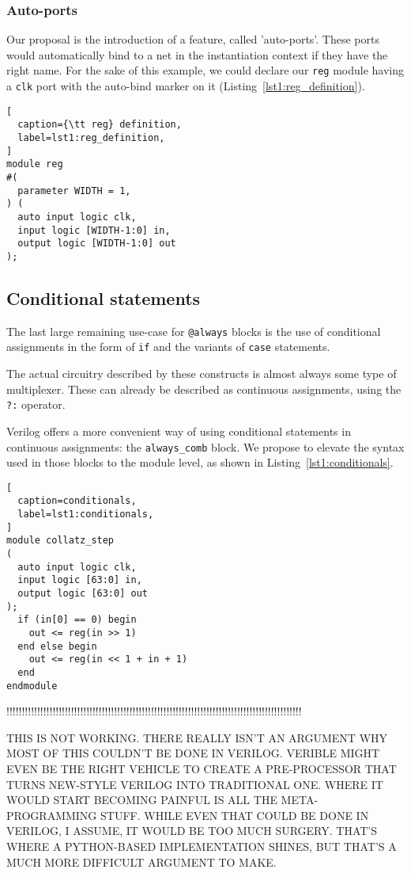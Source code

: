 \documentclass[conference,compsoc]{IEEEtran}
\begin{document}
\subsubsection{Auto-ports}
Our proposal is the introduction of a feature, called 'auto-ports'. These ports would automatically
bind to a net in the instantiation context if they have the right name. For the sake of this
example, we could declare our {\tt reg} module having a {\tt clk} port with the auto-bind
marker on it (Listing~\ref{lst1:reg_definition}).

\begin{lstlisting}[
  caption={\tt reg} definition,
  label=lst1:reg_definition,
]
module reg
#(
  parameter WIDTH = 1,
) (
  auto input logic clk,
  input logic [WIDTH-1:0] in,
  output logic [WIDTH-1:0] out
);
\end{lstlisting}

\subsection{Conditional statements}
The last large remaining use-case for {\tt @always} blocks is the use of conditional
assignments in the form of {\tt if} and the variants of {\tt case} statements.

The actual circuitry described by these constructs is almost always some type of
multiplexer. These can already be described as continuous assignments, using the
{\tt ?:} operator.

Verilog offers a more convenient way of using conditional statements in continuous
assignments: the {\tt always\_comb} block. We propose to elevate the syntax used
in those blocks to the module level, as shown in Listing~\ref{lst1:conditionals}.

\begin{lstlisting}[
  caption=conditionals,
  label=lst1:conditionals,
]
module collatz_step
(
  auto input logic clk,
  input logic [63:0] in,
  output logic [63:0] out
);
  if (in[0] == 0) begin
    out <= reg(in >> 1)
  end else begin
    out <= reg(in << 1 + in + 1)
  end
endmodule
\end{lstlisting}

!!!!!!!!!!!!!!!!!!!!!!!!!!!!!!!!!!!!!!!!!!!!!!!!!!!!!!!!!!!!!!!!!!!!!!!!!!!!!!!!!!!!!!!!!!!!!!!!

THIS IS NOT WORKING. THERE REALLY ISN'T AN ARGUMENT WHY MOST OF THIS COULDN'T BE DONE IN VERILOG.
VERIBLE MIGHT EVEN BE THE RIGHT VEHICLE TO CREATE A PRE-PROCESSOR THAT TURNS NEW-STYLE VERILOG
INTO TRADITIONAL ONE. WHERE IT WOULD START BECOMING PAINFUL IS ALL THE META-PROGRAMMING STUFF.
WHILE EVEN THAT COULD BE DONE IN VERILOG, I ASSUME, IT WOULD BE TOO MUCH SURGERY. THAT'S WHERE
A PYTHON-BASED IMPLEMENTATION SHINES, BUT THAT'S A MUCH MORE DIFFICULT ARGUMENT TO MAKE.
\end{document}
